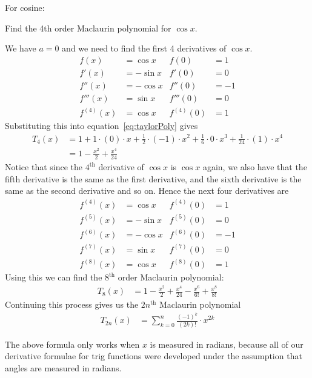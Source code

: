 For cosine:
\begin{eg}\label{eg expand cosx}
 Find the 4th order Maclaurin polynomial for $\cos x$.

\soln We have $a=0$ and we need to find the first 4 derivatives of $\cos x$.
\begin{align*}
 f(x) &= \cos x & f(0) &= 1 \\
 f'(x) &= -\sin x & f'(0) &= 0 \\
 f''(x) &= -\cos x & f''(0) &= -1 \\
 f'''(x) &= \sin x & f'''(0) &= 0 \\
 f^{(4)}(x) &= \cos x & f^{(4)}(0) &= 1
\end{align*}
Substituting this into equation~\eqref{eq:taylorPoly} gives
\begin{align*}
  T_4(x)&= 1 + 1\cdot (0) \cdot x
  + \frac{1}{2} \cdot (-1) \cdot x^2
  + \frac{1}{6} \cdot 0 \cdot x^3
  + \frac{1}{24} \cdot (1) \cdot x^4 \\
  &= 1 - \frac{x^2}{2} + \frac{x^4}{24}
\end{align*}
Notice that since the $4^\mathrm{th}$ derivative of $\cos x$ is $\cos x$ again, we also
have that the fifth derivative is the same as the first derivative, and the sixth
derivative is the same as the second derivative and so on. Hence the next four
derivatives are
\begin{align*}
 f^{(4)}(x) &= \cos x & f^{(4)}(0) &= 1 \\
 f^{(5)}(x) &= -\sin x & f^{(5)}(0) &= 0 \\
 f^{(6)}(x) &= -\cos x & f^{(6)}(0) &= -1 \\
 f^{(7)}(x) &= \sin x & f^{(7)}(0) &= 0 \\
 f^{(8)}(x) &= \cos x & f^{(8)}(0) &= 1
\end{align*}
Using this we can find the $8^\mathrm{th}$ order Maclaurin polynomial:
\begin{align*}
  T_8(x) &=
  1 - \frac{x^2}{2} + \frac{x^4}{24} -\frac{x^6}{6!} + \frac{x^8}{8!}
\end{align*}
Continuing this process gives us the $2n^\mathrm{th}$ Maclaurin polynomial
\begin{align*}
  T_{2n}(x) &= \sum_{k=0}^n \frac{(-1)^k}{(2k)!} \cdot x^{2k}
\end{align*}
\begin{warning}
The above formula only works when $x$ is measured in radians, because all of our
derivative formulae for trig functions were developed under the assumption that
angles are measured in radians.
\end{warning}


\end{eg}
